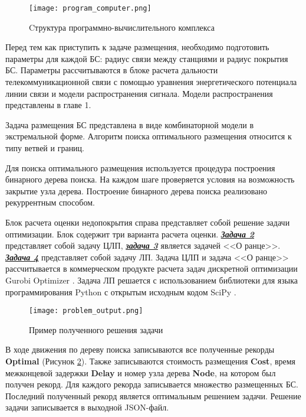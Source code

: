 \begin{figure}[h!]
  \centering
   \texttt{[image: program\_computer.png]}
\caption{Cтруктура программно-вычислительного комплекса}
\label{fig:part4_program_computer}
\end{figure}

Перед тем как приступить к задаче размещения, необходимо подготовить параметры для каждой БС: радиус связи между станциями и радиус покрытия БС. Параметры рассчитываются в блоке расчета дальности телекоммуникационной связи с помощью уравнения энергетического потенциала линии связи и модели распространения сигнала. Модели распространения представлены в главе 1.


Задача размещения БС представлена в виде комбинаторной модели в экстремальной форме. Алгоритм поиска оптимального размещения относится к типу ветвей и границ. 

Для поиска оптимального размещения используется процедура построения бинарного дерева поиска. На каждом шаге проверяется условия на возможность закрытие узла дерева. Построение бинарного дерева поиска реализовано рекуррентным способом.

Блок расчета оценки недопокрытия справа представляет собой решение задачи оптимизации. Блок содержит три варианта расчета оценки. \underline{\textit{\textbf{Задача 2}}} представляет собой задачу ЦЛП, \underline{\textit{\textbf{задача 3}}} является задачей <<О ранце>>. \underline{\textit{\textbf{Задача 4}}} представляет собой задачу ЛП. Задача ЦЛП и задача <<О ранце>> рассчитывается в коммерческом продукте расчета задач дискретной оптимизации Gurobi Optimizer \cite{gurobi}. Задача ЛП решается с использованием библиотеки для языка программирования Python с открытым исходным кодом SciPy \cite{scipy}. 


\begin{figure}[h!]
  \centering
   \texttt{[image: problem\_output.png]}
\caption{Пример полученного решения задачи}
\label{fig:part4_problem_output}
\end{figure}

В ходе движения по дереву поиска записываются все полученные рекорды \textbf{Optimal} (Рисунок \cref{fig:part4_problem_output}). Также записываются стоимость размещения \textbf{Cost}, время межконцевой задержки \textbf{Delay} и номер узла дерева \textbf{Node}, на котором был получен рекорд. Для каждого рекорда записывается множество размещенных БС. Последний полученный рекорд является оптимальным решением задачи. Решение задачи записывается в выходной JSON-файл.

